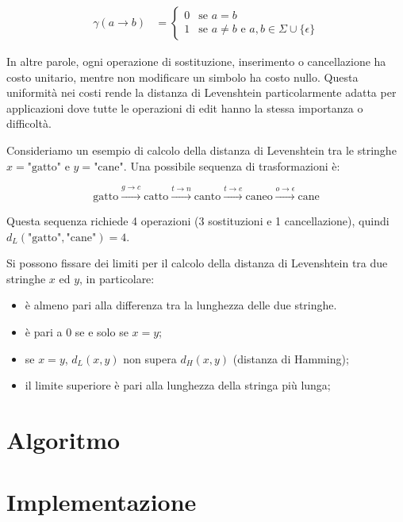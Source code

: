 \documentclass[a4paper,12pt]{report}
\theoremstyle{propositionstyle}
\begin{document}
    \begin{align}
        \gamma(a \rightarrow b) &= \begin{cases}
                                       0 & \text{se } a = b \\
                                       1 & \text{se } a \neq b \text{ e } a, b \in \Sigma \cup \{\epsilon\}
        \end{cases}
    \end{align}

    In altre parole, ogni operazione di sostituzione, inserimento o cancellazione ha costo unitario, mentre non modificare un simbolo ha costo nullo. Questa uniformità nei costi rende la distanza di Levenshtein particolarmente adatta per applicazioni dove tutte le operazioni di edit hanno la stessa importanza o difficoltà.

    Consideriamo un esempio di calcolo della distanza di Levenshtein tra le stringhe $x = \text{"gatto"}$ e $y = \text{"cane"}$. Una possibile sequenza di trasformazioni è:

    $$\text{gatto} \xrightarrow{g \rightarrow c} \text{catto} \xrightarrow{t \rightarrow n} \text{canto} \xrightarrow{t \rightarrow e} \text{caneo} \xrightarrow{o \rightarrow \epsilon} \text{cane}$$

    Questa sequenza richiede 4 operazioni (3 sostituzioni e 1 cancellazione), quindi $d_L(\text{"gatto"}, \text{"cane"}) = 4$.

    Si possono fissare dei limiti per il calcolo della distanza di Levenshtein tra due stringhe $x$ ed $y$, in particolare:
    \begin{itemize}
        \item è almeno pari alla differenza tra la lunghezza delle due stringhe.
        \item è pari a 0 se e solo se $x = y$;
        \item se $x = y$, $d_L(x, y)$ non supera $d_H(x, y)$ (distanza di Hamming);
        \item il limite superiore è pari alla lunghezza della stringa più lunga;
    \end{itemize}

    \section{Algoritmo}

    \section{Implementazione}
\end{document}
